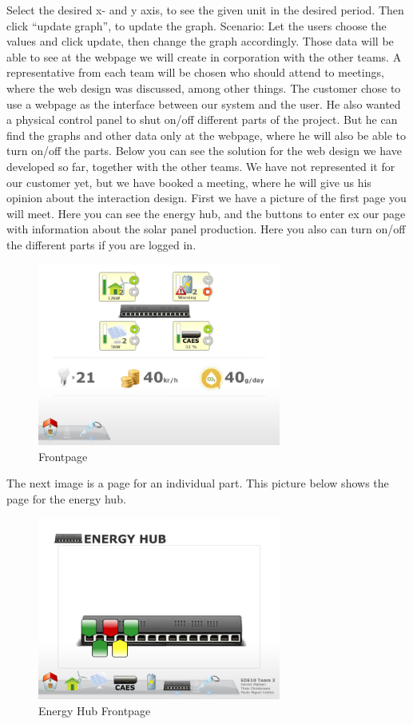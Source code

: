 \documentclass[12pt,a4paper]{report}
\begin{document}
Select the desired x- and y axis, to see the given unit in the desired period.
Then click “update graph”, to update the graph.
Scenario: Let the users choose the values and click update, then change the graph accordingly.
Those data will be able to see at the webpage we will create in corporation with the other teams. A representative from each team will be chosen who should attend to meetings, where the web design was discussed, among other things.
The customer chose to use a webpage as the interface between our system and the user. He also wanted a physical control panel to shut on/off different parts of the project. But he can find the graphs and other data only at the webpage, where he will also be able to turn on/off the parts.
Below you can see the solution for the web design we have developed so far, together with the other teams. We have not represented it for our customer yet, but we have booked a meeting, where he will give us his opinion about the interaction design.
First we have a picture of the first page you will meet. Here you can see the energy hub, and the buttons to enter ex our page with information about the solar panel production. Here you also can turn on/off the different parts if you are logged in.

\begin{figure}[htbp]
\centering
\includegraphics[width=8cm]{images/frontpage}
\caption{Frontpage}
\label{fig:800px-Frontpage_public}
\end{figure}


The next image is a page for an individual part. This picture below shows the page for the energy hub.

\begin{figure}[htbp]
\centering
\includegraphics[width=8cm]{images/submodulepage}
\caption{Energy Hub Frontpage}
\label{fig:800px-Submodule_page}
\end{figure}
\end{document}

